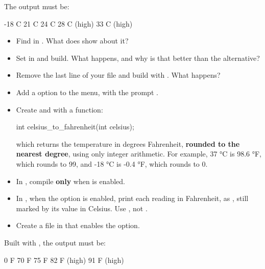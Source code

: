 The output must be:

\begin{console}
-18 C
21 C
24 C
28 C (high)
33 C (high)
\end{console}

\begin{itemize}
  \item Find  in . What does  show about it?
  \item Set  in  and build. What happens, and why is that better
    than the alternative?
  \item Remove the last line of your  file and build with . What happens?
\end{itemize}

\label{c1:ex:3.2}

\begin{itemize}
  \item Add a  option  to the  menu, with the prompt
    .
  \item Create  and  with a function:
\begin{ccode}
int celsius_to_fahrenheit(int celsius);
\end{ccode}
which returns the temperature in degrees Fahrenheit, \textbf{rounded to the nearest degree}, using
only integer arithmetic. For example, 37 °C is 98.6 °F, which rounds to 99, and -18 °C is -0.4 °F,
which rounds to 0.
  \item In , compile  \textbf{only} when
     is enabled.
  \item In , when the option is enabled, print each reading in Fahrenheit, as ,
    still marked  by its value in Celsius. Use , not .
  \item Create a file  in  that enables the option.
\end{itemize}

Built with , the output must be:

\begin{console}
0 F
70 F
75 F
82 F (high)
91 F (high)
\end{console}


